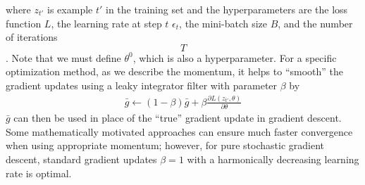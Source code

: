 \documentclass{article}
\begin{document}
where  $z_{t'}$ is example  $t'$  in the training set and the hyperparameters are the loss function $L$, the learning rate at step $t$ $\epsilon _t$, the mini-batch size $B$, and the number of iterations $$T$$. Note that we must define $\theta ^0$, which is also a hyperparameter. For a specific optimization method, as we describe the momentum, it helps to “smooth” the gradient updates using a leaky integrator filter with parameter $\beta$ by
\begin{align}
	\bar g \leftarrow (1-\beta)\bar g+ \beta \frac{\partial L(z_{t'},\theta)}{\partial \theta } 
\end{align}
$\bar g$ can then be used in place of the “true” gradient update in gradient descent. Some mathematically motivated approaches can ensure much faster convergence when using appropriate momentum; however, for pure stochastic gradient descent, standard gradient updates $\beta =1$  with a harmonically decreasing learning rate is optimal.
\end{document}
